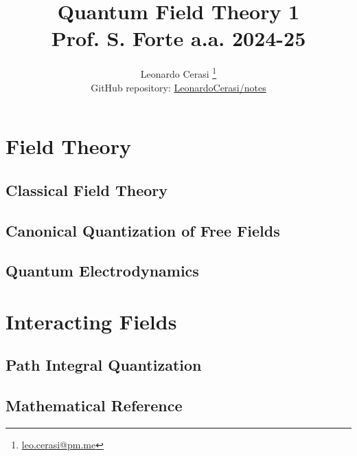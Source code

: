 \documentclass[a4paper, 12pt]{book}
\title{\Huge\textbf{Quantum Field Theory 1} \\ \large Prof. S. Forte a.a. 2024-25}
\author{Leonardo Cerasi%
	\thanks{\scriptsize\href{mailto:leonardo.cerasi@studenti.unimi.it}{leo.cerasi@pm.me}}\\
	\small GitHub repository: \href{https://github.com/LeonardoCerasi/notes}{LeonardoCerasi/notes}}
\begin{document}
\frontmatter

\maketitle

\tableofcontents

\pagestyle{contents}

\mainmatter

\part{Field Theory}
\pagestyle{body}

\chapter{Classical Field Theory}


\chapter{Canonical Quantization of Free Fields}


\chapter{Quantum Electrodynamics}


\part{Interacting Fields}
\pagestyle{body}

\chapter{Path Integral Quantization}


\begin{appendices}
\pagestyle{append}

\chapter{Mathematical Reference}


\clearpage
\end{appendices}

\pagestyle{biblio}
\printbibliography[heading = bibintoc, title = {Bibliography}]
\end{document}
